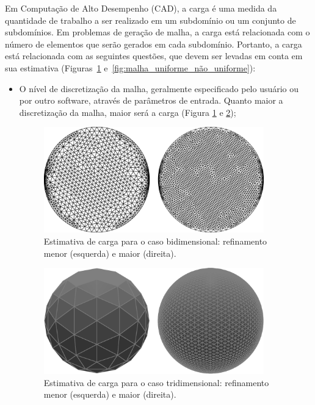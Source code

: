 Em Computação de Alto Desempenho (CAD), a carga é uma medida da quantidade de trabalho a ser realizado em um subdomínio ou um conjunto de subdomínios. Em problemas de geração de malha, a carga está relacionada com o número de elementos que serão gerados em cada subdomínio. Portanto, a carga está relacionada com as seguintes questões, que devem ser levadas em conta em sua estimativa (Figuras~\ref{fig:malha_norma_refinada} e~\ref{fig:malha_uniforme_não_uniforme}):

\begin{itemize}
	\item O nível de discretização da malha, geralmente especificado pelo usuário ou por outro software, através de parâmetros de entrada. Quanto maior a discretização da malha, maior será a carga (Figura \ref{fig:malha_norma_refinada} e \ref{fig:malha_norma_refinada_trid});

\begin{figure}[!ht]
	\centering
	\includegraphics[width=0.9\textwidth]{fig/meshes_normal_and_refined.png}
	\caption{Estimativa de carga para o caso bidimensional: refinamento menor (esquerda) e maior (direita).}
	\label{fig:malha_norma_refinada}
\end{figure}

\begin{figure}[!ht]
	\centering
	\includegraphics[width=0.9\textwidth]{fig/esferas_comp_ref.png}
	\caption{Estimativa de carga para o caso tridimensional: refinamento menor (esquerda) e maior (direita).}
	\label{fig:malha_norma_refinada_trid}
\end{figure}


\end{itemize}
